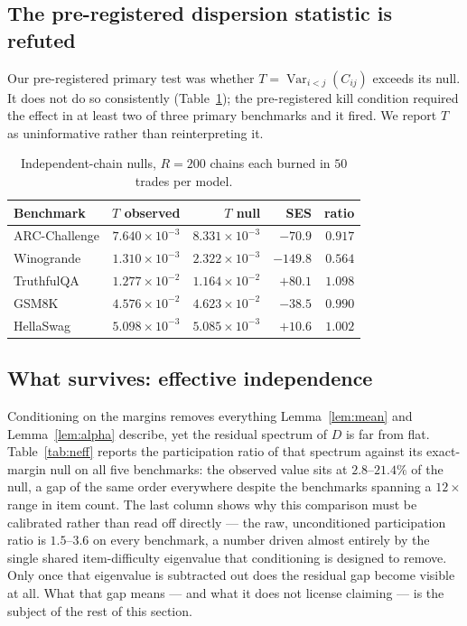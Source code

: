 \documentclass[pdflatex,sn-mathphys-ay]{sn-jnl}
\theoremstyle{thmstyleone}
\theoremstyle{thmstylethree}
\begin{document}
\subsection{The pre-registered dispersion statistic is refuted}

Our pre-registered primary test was whether $T=\operatorname{Var}_{i<j}(C_{ij})$ exceeds its null.
It does not do so consistently (Table~\ref{tab:T}); the pre-registered kill condition required
the effect in at least two of three primary benchmarks and it fired. We report $T$ as
uninformative rather than reinterpreting it.

\begin{table}[t]\centering\small
\begin{tabular}{lrrrr}
\toprule
Benchmark & $T$ observed & $T$ null & SES & ratio \\
\midrule
ARC-Challenge & $7.640\times10^{-3}$ & $8.331\times10^{-3}$ & $-70.9$ & $0.917$ \\
Winogrande & $1.310\times10^{-3}$ & $2.322\times10^{-3}$ & $-149.8$ & $0.564$ \\
TruthfulQA & $1.277\times10^{-2}$ & $1.164\times10^{-2}$ & $+80.1$ & $1.098$ \\
GSM8K & $4.576\times10^{-2}$ & $4.623\times10^{-2}$ & $-38.5$ & $0.990$ \\
HellaSwag & $5.098\times10^{-3}$ & $5.085\times10^{-3}$ & $+10.6$ & $1.002$ \\
\bottomrule
\end{tabular}
\caption{Independent-chain nulls, $R=200$ chains each burned in $50$ trades per model.}
\label{tab:T}
\end{table}

\subsection{What survives: effective independence}
\label{sec:survives}

Conditioning on the margins removes everything Lemma~\ref{lem:mean} and Lemma~\ref{lem:alpha}
describe, yet the residual spectrum of $D$ is far from flat. Table~\ref{tab:neff} reports the
participation ratio of that spectrum against its exact-margin null on all five benchmarks: the
observed value sits at $2.8$--$21.4\%$ of the null, a gap of the same order everywhere despite the
benchmarks spanning a $12\times$ range in item count. The last column shows why this comparison
must be calibrated rather than read off directly --- the raw, unconditioned participation ratio
is $1.5$--$3.6$ on every benchmark, a number driven almost entirely by the single shared
item-difficulty eigenvalue that conditioning is designed to remove. Only once that eigenvalue is
subtracted out does the residual gap become visible at all. What that gap means --- and what it
does not license claiming --- is the subject of the rest of this section.
\end{document}
